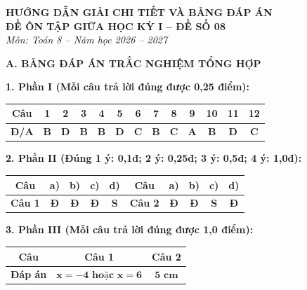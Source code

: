 \documentclass[12pt,a4paper]{article}
\begin{document}
\begin{center}
  \textbf{\Large HƯỚNG DẪN GIẢI CHI TIẾT VÀ BẢNG ĐÁP ÁN}\\
  \textbf{\large ĐỀ ÔN TẬP GIỮA HỌC KỲ I -- ĐỀ SỐ 08}\\
  \textit{Môn: Toán 8 -- Năm học 2026 -- 2027}
\end{center}
\vspace{2mm}

\noindent\textbf{\large A. BẢNG ĐÁP ÁN TRẮC NGHIỆM TỔNG HỢP}
\vspace{1mm}

\noindent\textbf{1. Phần I (Mỗi câu trả lời đúng được 0,25 điểm):}
\begin{center}
\begin{tabular}{|c|c|c|c|c|c|c|c|c|c|c|c|c|}
\hline
\textbf{Câu} & \textbf{1} & \textbf{2} & \textbf{3} & \textbf{4} & \textbf{5} & \textbf{6} & \textbf{7} & \textbf{8} & \textbf{9} & \textbf{10} & \textbf{11} & \textbf{12} \\
\hline
\textbf{Đ/A} & \textbf{B} & \textbf{D} & \textbf{B} & \textbf{B} & \textbf{D} & \textbf{C} & \textbf{B} & \textbf{C} & \textbf{A} & \textbf{B} & \textbf{D} & \textbf{C} \\
\hline
\end{tabular}
\end{center}
\vspace{0.5mm}

\noindent\textbf{2. Phần II (Đúng 1 ý: 0,1đ; 2 ý: 0,25đ; 3 ý: 0,5đ; 4 ý: 1,0đ):}
\begin{center}
\begin{tabular}{|c|c|c|c|c||c|c|c|c|c|}
\hline
\textbf{Câu} & \textbf{a)} & \textbf{b)} & \textbf{c)} & \textbf{d)} & \textbf{Câu} & \textbf{a)} & \textbf{b)} & \textbf{c)} & \textbf{d)} \\
\hline
\textbf{Câu 1} & \textbf{Đ} & \textbf{Đ} & \textbf{Đ} & \textbf{S} & \textbf{Câu 2} & \textbf{Đ} & \textbf{Đ} & \textbf{S} & \textbf{Đ} \\
\hline
\end{tabular}
\end{center}
\vspace{0.5mm}

\noindent\textbf{3. Phần III (Mỗi câu trả lời đúng được 1,0 điểm):}
\begin{center}
\begin{tabular}{|c|c|c|}
\hline
\textbf{Câu} & \textbf{Câu 1} & \textbf{Câu 2} \\
\hline
\textbf{Đáp án} & $\mathbf{x = -4 \text{ hoặc } x = 6}$ & $\mathbf{5\text{ cm}}$ \\
\hline
\end{tabular}
\end{center}
\vspace{1.5mm}
\end{document}
